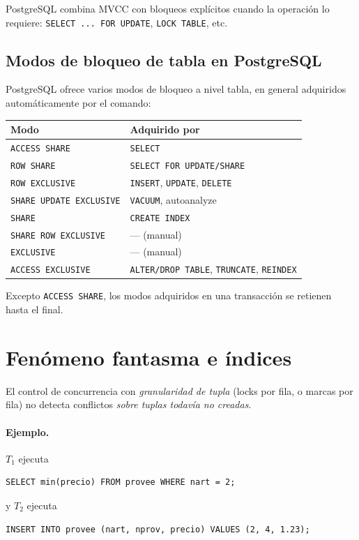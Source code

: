 \documentclass[11pt,a4paper]{article}
\begin{document}
PostgreSQL combina MVCC con bloqueos explícitos cuando la operación lo
requiere: \texttt{SELECT ... FOR UPDATE}, \texttt{LOCK TABLE}, etc.

\subsection{Modos de bloqueo de tabla en PostgreSQL}

PostgreSQL ofrece varios modos de bloqueo a nivel tabla, en general
adquiridos automáticamente por el comando:

\begin{center}
\begin{tabular}{ll}
\toprule
Modo & Adquirido por \\
\midrule
\texttt{ACCESS SHARE}          & \texttt{SELECT} \\
\texttt{ROW SHARE}             & \texttt{SELECT FOR UPDATE/SHARE} \\
\texttt{ROW EXCLUSIVE}         & \texttt{INSERT}, \texttt{UPDATE}, \texttt{DELETE} \\
\texttt{SHARE UPDATE EXCLUSIVE} & \texttt{VACUUM}, autoanalyze \\
\texttt{SHARE}                 & \texttt{CREATE INDEX} \\
\texttt{SHARE ROW EXCLUSIVE}   & --- (manual) \\
\texttt{EXCLUSIVE}             & --- (manual) \\
\texttt{ACCESS EXCLUSIVE}      & \texttt{ALTER/DROP TABLE}, \texttt{TRUNCATE}, \texttt{REINDEX} \\
\bottomrule
\end{tabular}
\end{center}

Excepto \texttt{ACCESS SHARE}, los modos adquiridos en una transacción se
retienen hasta el final.

\section{Fenómeno fantasma e índices}

El control de concurrencia con \emph{granularidad de tupla} (locks por
fila, o marcas por fila) no detecta conflictos \emph{sobre tuplas
todavía no creadas}.

\paragraph{Ejemplo.} $T_1$ ejecuta
\begin{lstlisting}
SELECT min(precio) FROM provee WHERE nart = 2;
\end{lstlisting}
y $T_2$ ejecuta
\begin{lstlisting}
INSERT INTO provee (nart, nprov, precio) VALUES (2, 4, 1.23);
\end{lstlisting}
\end{document}
